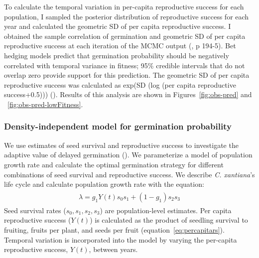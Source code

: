 \documentclass[12pt, oneside, titlepage]{article}   	%
\begin{document}
{To calculate the temporal variation in per-capita reproductive success for each population, I sampled the posterior distribution of reproductive success for each year and calculated the geometric SD of per capita reproductive success. I obtained the sample correlation of germination and geometric SD of per capita reproductive success at each iteration of the MCMC output (\cite{hobbs2015b}, p 194-5). Bet hedging models predict that germination probability should be negatively correlated with temporal variance in fitness; 95\% credible intervals that do not overlap zero provide support for this prediction. The geometric SD of per capita reproductive success was calculated as exp(SD (log (per capita reproductive success+0.5))) (\cite{venable2007}). Results of this analysis are shown in Figures~\ref{fig:obs-pred} and ~\ref{fig:obs-pred-lowFitness}.


\subsubsection*{Density-independent model for germination probability}

We use estimates of seed survival and reproductive success to investigate the adaptive value of delayed germination (\cite{gremer2014}). We parameterize a model of population growth rate and calculate the optimal germination strategy for different combinations of seed survival and reproductive success. We describe \textit{C. xantiana}'s life cycle and calculate population growth rate with the equation:
%
\begin{align}
  \begin{split}
\lambda = g_1 Y(t) s_0 s_1  + (1-g_1) s_2 s_3  \label{eq:di-equation}
  \end{split}
\end{align}
%
Seed survival rates ($s_0, s_1, s_2, s_3$) are population-level estimates. Per capita reproductive success ($Y(t)$) is calculated as the product of seedling survival to fruiting, fruits per plant, and seeds per fruit (equation~\eqref{eq:percapitars}). Temporal variation is incorporated into the model by varying the per-capita reproductive success, $Y(t)$, between years.

}
\end{document}
